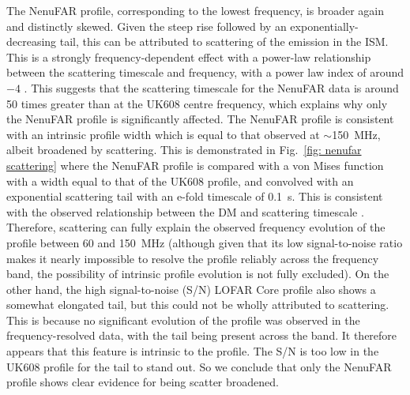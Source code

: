 The NenuFAR profile, corresponding to the lowest frequency, is broader again and distinctly skewed. Given the steep rise followed by an exponentially-decreasing tail, this can be attributed to scattering of the emission in the ISM. This is a strongly frequency-dependent effect with a power-law relationship between the scattering timescale and frequency, with a power law index of around $-4$ \citep{SDOx1980, PulsarAstronomy,GKK+2017}. This suggests that the scattering timescale for the NenuFAR data is around 50 times greater than at the UK608 centre frequency, which explains why only the NenuFAR profile is significantly affected. The NenuFAR profile is consistent with an intrinsic profile width which is equal to that observed at $\sim$150~MHz, albeit broadened by scattering. This is demonstrated in Fig.~\ref{fig: nenufar scattering} where the NenuFAR profile is compared with a von Mises function with a width equal to that of the UK608 profile, and convolved with an exponential scattering tail with an e-fold timescale of 0.1~s. This is consistent with the observed relationship between the DM and scattering timescale \citep[e.g.][]{BCC+2004,IJWx2019}. Therefore, scattering can fully explain the observed frequency evolution of the profile between 60 and 150~MHz (although given that its low signal-to-noise ratio makes it nearly impossible to resolve the profile reliably across the frequency band, the possibility of intrinsic profile evolution is not fully excluded). On the other hand, the high signal-to-noise (S/N) LOFAR Core profile also shows a somewhat elongated tail, but this could not be wholly attributed to scattering. This is because no significant evolution of the profile was observed in the frequency-resolved data, with the tail being present across the band. It therefore appears that this feature is intrinsic to the profile. The S/N is too low in the UK608 profile for the tail to stand out. So we conclude that only the NenuFAR profile shows clear evidence for being scatter broadened.
